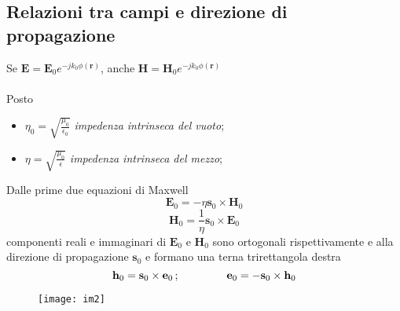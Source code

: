 \documentclass[a4paper]{article}
\begin{document}
\subsection*{Relazioni tra campi e direzione di propagazione}
Se $\textbf{E}=\textbf{E}_0e^{-jk_0\phi(\textbf{r})}$, anche $\textbf{H}=\textbf{H}_0e^{-jk_0\phi(\textbf{r})}$\\\\
Posto
\begin{itemize}
\item $\eta_0=\sqrt{\frac{\mu_0}{\epsilon_0}}$ \emph{impedenza intrinseca del vuoto};
\item $\eta=\sqrt{\frac{\mu_0}{\epsilon}}$ \emph{impedenza intrinseca del mezzo};
\end{itemize}
Dalle prime due equazioni di Maxwell
\begin{equation*}
\textbf{E}_0=-\eta\textbf{s}_0\times\textbf{H}_0
\end{equation*}
\begin{equation*}
\textbf{H}_0=\frac{1}{\eta}\textbf{s}_0\times\textbf{E}_0
\end{equation*}
componenti reali e immaginari di $\textbf{E}_0$ e $\textbf{H}_0$ sono ortogonali rispettivamente e alla direzione di propagazione $\textbf{s}_0$ e formano una terna trirettangola destra
\begin{equation*}
\textbf{h}_0=\textbf{s}_0\times\textbf{e}_0\,;\hspace{15mm}\textbf{e}_0=-\textbf{s}_0\times\textbf{h}_0
\end{equation*}
\begin{figure}[ht] 
\centering
\texttt{[image: im2]}
\end{figure}
\end{document}
